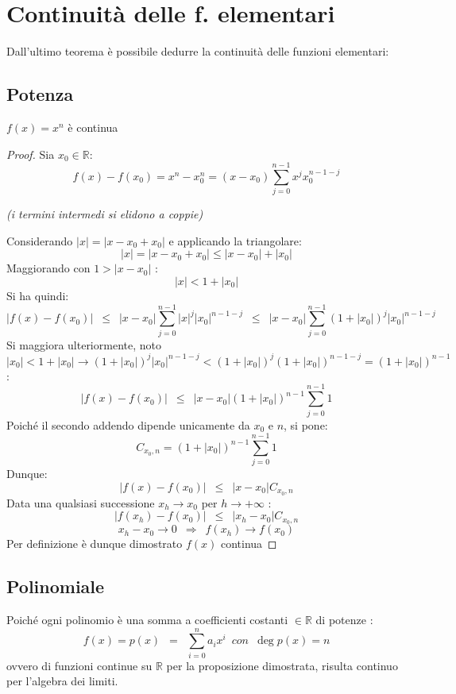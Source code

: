 \documentclass[10pt, oneside]{book}
\theoremstyle{plain}
\begin{document}
\hypertarget{elementarii}{\section{Continuità delle f. elementari}
Dall'ultimo teorema è possibile dedurre la continuità delle funzioni elementari:}
\subsection*{Potenza}
\begin{prop}
$f(x) = x^n$ è continua
\end{prop}
\begin{proof}
Sia $x_0 \in \mathbb{R}$: 
\[f(x) - f(x_0) = x^n - x_0^n = (x-x_0)\sum \limits_{j=0}^{n-1} x^j x_0^{n-1-j} \]
\begin{center} \textit{(i termini intermedi si elidono a coppie)} \end{center}
Considerando $|x| = |x - x_0 + x_0|$ e applicando la triangolare: 
\[|x| = |x-x_0 + x_0| \leq |x - x_0| + |x_0|\] Maggiorando con $1 > |x - x_0|$ : \[|x| < 1 + |x_0|\]
Si ha quindi:
\[|f(x) - f(x_0)| \enspace \leq  \enspace |x-x_0| \sum \limits_{j=0}^{n-1} |x|^j |x_0|^{n-1-j} \enspace \leq \enspace |x-x_0| \sum \limits_{j=0}^{n-1} (1+|x_0|)^j |x_0|^{n-1-j}\]
Si maggiora ulteriormente, noto $|x_0| < 1 + |x_0| \rightarrow (1+|x_0|)^j |x_0|^{n-1-j} < (1+|x_0|)^j (1 + |x_0|)^{n-1-j} = (1 + |x_0|)^{n-1}$:
\[|f(x) - f(x_0)| \enspace \leq  \enspace |x-x_0| (1+|x_0|)^{n-1} \sum \limits_{j=0}^{n-1} 1\]
Poiché il secondo addendo dipende unicamente da $x_0$ e $n$, si pone:
\[C_{x_0, n} = (1+|x_0|)^{n-1} \sum \limits_{j=0}^{n-1} 1\]
Dunque:
\[|f(x) - f(x_0)| \enspace \leq  \enspace |x-x_0|  C_{x_0, n}\]
Data una qualsiasi successione $x_h \longrightarrow x_0$ per $h \rightarrow + \infty$ :
\[|f(x_h) - f(x_0)| \enspace \leq  \enspace |x_h-x_0|  C_{x_0, n}\]
\[x_h-x_0 \rightarrow 0 \enspace \Longrightarrow \enspace f(x_h) \rightarrow f(x_0)\]
Per definizione è dunque dimostrato $f(x)$ continua
\end{proof}

\subsection*{Polinomiale}
Poiché ogni polinomio è una somma a coefficienti costanti $\in \mathbb{R}$ di potenze :
\[f(x) = p(x) \enspace = \enspace \sum \limits_{i=0}^n a_i x^i \enspace {con} \enspace \deg p(x) = n\]
ovvero di funzioni continue su $\mathbb{R}$ per la proposizione dimostrata, \hypertarget{contin}{risulta continuo} per l'algebra dei limiti.
\end{document}
